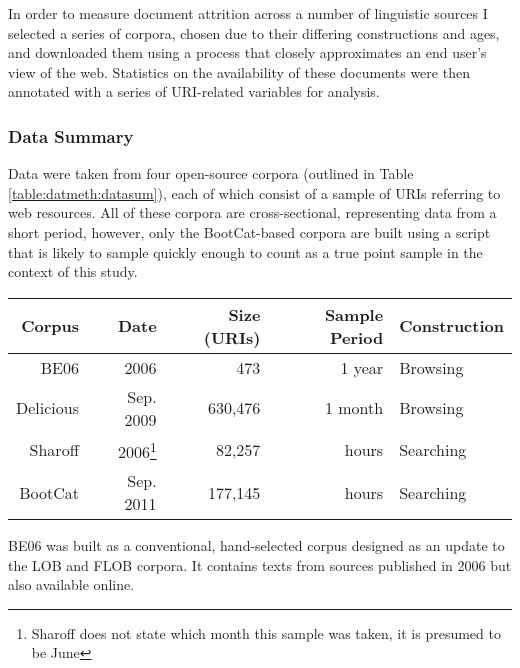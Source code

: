 In order to measure document attrition across a number of linguistic sources I selected a series of corpora, chosen due to their differing constructions and ages, and downloaded them using a process that closely approximates an end user's view of the web.  Statistics on the availability of these documents were then annotated with a series of URI-related variables for analysis.




\subsubsection{Data Summary}
Data were taken from four open-source corpora (outlined in Table \ref{table:datmeth:datasum}), each of which consist of a sample of URIs referring to web resources.  All of these corpora are cross-sectional, representing data from a short period, however, only the BootCat-based corpora are built using a script that is likely to sample quickly enough to count as a true point sample in the context of this study.

\begin{table*}[ht!]
    \centering
    \begin{tabular}{r | r | r | r | l  }
    Corpus    & Date	    & Size (URIs)   & Sample Period	& Construction \\ 
    \hline
    BE06      & 2006	    & 473	    & 1 year		&  Browsing \\ 
    Delicious & Sep. 2009   & 630,476	    & 1 month		&  Browsing \\
    Sharoff   & 2006\footnote{Sharoff does not state which month this sample was taken, it is presumed to be June}	    
                            & 82,257	    & hours		&  Searching \\
    BootCat  & Sep. 2011   & 177,145	    & hours		&  Searching \\ 
    \end{tabular}

    \caption{An overview of the corpora selected for study.}
    \label{table:datmeth:datasum}
\end{table*}

BE06 %
was built as a conventional, hand-selected corpus designed as an update to the LOB\cite{johansson1980lob} and FLOB\cite{hundt1998manual} corpora.  It contains texts from sources published in 2006 but also available online.

